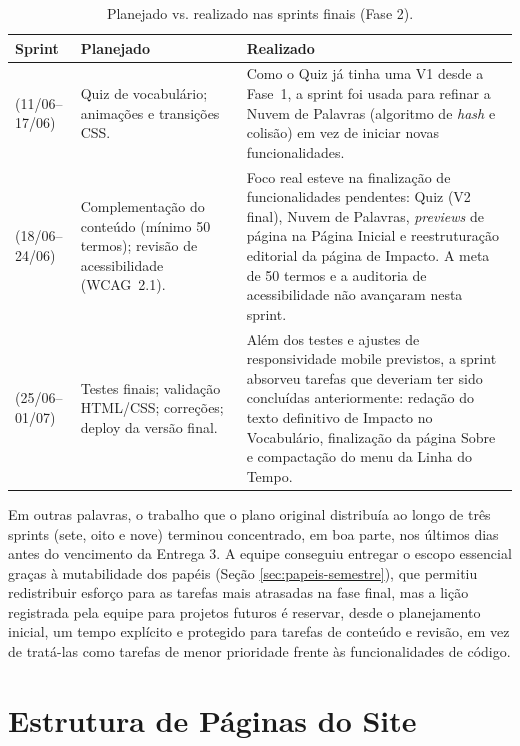 \documentclass[12pt,a4paper]{article}
\begin{document}
\begin{table}[H]
\centering
\caption{Planejado vs. realizado nas sprints finais (Fase 2).}
\label{tab:sprints-real}
\renewcommand{\arraystretch}{1.4}
\begin{tabular}{>{\centering\arraybackslash}m{1.0cm} >{\raggedright\arraybackslash}m{5.3cm} >{\raggedright\arraybackslash}m{5.7cm}}
\toprule
\textbf{Sprint} & \textbf{Planejado} & \textbf{Realizado} \\
\midrule
7 (11/06--17/06) &
Quiz de vocabulário; animações e transições CSS. &
Como o Quiz já tinha uma V1 desde a Fase~1, a sprint foi usada para refinar a Nuvem de
Palavras (algoritmo de \textit{hash} e colisão) em vez de iniciar novas funcionalidades. \\
\midrule
8 (18/06--24/06) &
Complementação do conteúdo (mínimo 50 termos); revisão de acessibilidade (WCAG~2.1). &
Foco real esteve na finalização de funcionalidades pendentes: Quiz (V2 final), Nuvem de
Palavras, \textit{previews} de página na Página Inicial e reestruturação editorial da página de
Impacto. A meta de 50 termos e a auditoria de acessibilidade não avançaram nesta sprint. \\
\midrule
9 (25/06--01/07) &
Testes finais; validação HTML/CSS; correções; deploy da versão final. &
Além dos testes e ajustes de responsividade mobile previstos, a sprint absorveu tarefas que
deveriam ter sido concluídas anteriormente: redação do texto definitivo de Impacto no
Vocabulário, finalização da página Sobre e compactação do menu da Linha do Tempo. \\
\bottomrule
\end{tabular}
\end{table}

Em outras palavras, o trabalho que o plano original distribuía ao longo de três sprints (sete,
oito e nove) terminou concentrado, em boa parte, nos últimos dias antes do vencimento da Entrega
3. A equipe conseguiu entregar o escopo essencial graças à mutabilidade dos papéis (Seção
\ref{sec:papeis-semestre}), que permitiu redistribuir esforço para as tarefas mais atrasadas na
fase final, mas a lição registrada pela equipe para projetos futuros é reservar, desde o
planejamento inicial, um tempo explícito e protegido para tarefas de conteúdo e revisão, em vez
de tratá-las como tarefas de menor prioridade frente às funcionalidades de código.


\section{Estrutura de Páginas do Site}
\label{sec:estrutura-paginas}
\end{document}

